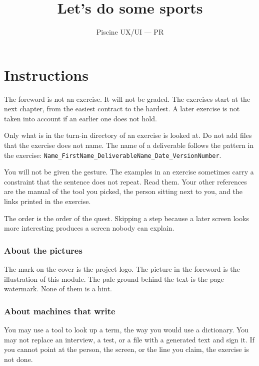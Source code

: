 \documentclass{training}
\begin{document}
\title{Let's do some sports}
\subtitle{Piscine UX/UI --- PR}
\maketitle

\newpage
\tableofcontents
\newpage


\chapter{Instructions}

The foreword is not an exercise. It will not be graded. The exercises start at the next chapter, from the easiest contract to the hardest. A later exercise is not taken into account if an earlier one does not hold.

Only what is in the turn-in directory of an exercise is looked at. Do not add files that the exercise does not name. The name of a deliverable follows the pattern in the exercise: \texttt{Name\_FirstName\_DeliverableName\_Date\_VersionNumber}.

You will not be given the gesture. The examples in an exercise sometimes carry a constraint that the sentence does not repeat. Read them. Your other references are the manual of the tool you picked, the person sitting next to you, and the links printed in the exercise.

The order is the order of the quest. Skipping a step because a later screen looks more interesting produces a screen nobody can explain.

\subsection*{About the pictures}

The mark on the cover is the project logo. The picture in the foreword is the illustration of this module. The pale ground behind the text is the page watermark. None of them is a hint.

\subsection*{About machines that write}

You may use a tool to look up a term, the way you would use a dictionary. You may not replace an interview, a test, or a file with a generated text and sign it. If you cannot point at the person, the screen, or the line you claim, the exercise is not done.
\end{document}
